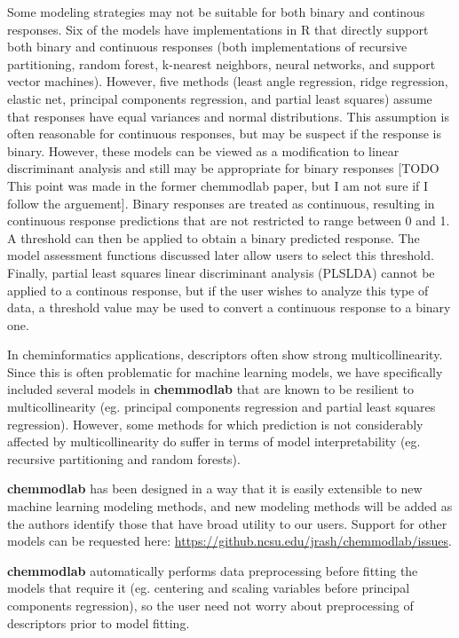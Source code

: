 Some modeling strategies may not be suitable for both binary and
continous responses. Six of the models have implementations in R that
directly support both binary and continuous responses (both
implementations of recursive partitioning, random forest, k-nearest
neighbors, neural networks, and support vector machines). However, five
methods (least angle regression, ridge regression, elastic net,
principal components regression, and partial least squares) assume that
responses have equal variances and normal distributions. This assumption
is often reasonable for continuous responses, but may be suspect if the
response is binary. However, these models can be viewed as a
modification to linear discriminant analysis and still may be
appropriate for binary responses {[}TODO This point was made in the
former chemmodlab paper, but I am not sure if I follow the arguement{]}.
Binary responses are treated as continuous, resulting in continuous
response predictions that are not restricted to range between 0 and 1. A
threshold can then be applied to obtain a binary predicted response. The
model assessment functions discussed later allow users to select this
threshold. Finally, partial least squares linear discriminant analysis
(PLSLDA) cannot be applied to a continous response, but if the user
wishes to analyze this type of data, a threshold value may be used to
convert a continuous response to a binary one.

In cheminformatics applications, descriptors often show strong
multicollinearity. Since this is often problematic for machine learning
models, we have specifically included several models in
\textbf{chemmodlab} that are known to be resilient to multicollinearity
(eg. principal components regression and partial least squares
regression). However, some methods for which prediction is not
considerably affected by multicollinearity do suffer in terms of model
interpretability (eg. recursive partitioning and random forests).

\textbf{chemmodlab} has been designed in a way that it is easily
extensible to new machine learning modeling methods, and new modeling
methods will be added as the authors identify those that have broad
utility to our users. Support for other models can be requested here:
\url{https://github.ncsu.edu/jrash/chemmodlab/issues}.

\textbf{chemmodlab} automatically performs data preprocessing before
fitting the models that require it (eg. centering and scaling variables
before principal components regression), so the user need not worry
about preprocessing of descriptors prior to model fitting.

